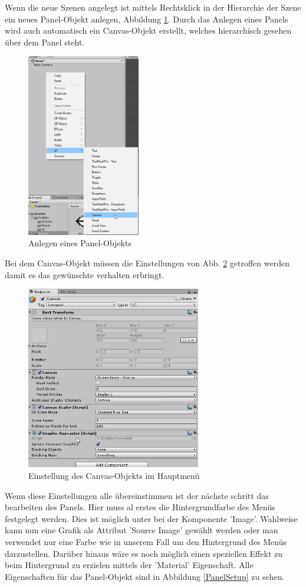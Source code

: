 Wenn die neue Szenen angelegt ist mittels Rechtsklick in der Hierarchie der Szene ein neues Panel-Objekt anlegen, Abbildung \ref{PanelAnlegen}. Durch das Anlegen eines Panels wird auch automatisch ein Canvas-Objekt erstellt, welches hierarchisch gesehen über dem Panel steht.

\begin{figure}[H]

	\includegraphics[height=8cm]{images/PanelAnlegen.png}
	\caption{Anlegen eines Panel-Objekts}
	\label{PanelAnlegen}
\end{figure}
Bei dem Canvas-Objekt müssen die Einstellungen von Abb. \ref{CanvasSetup} getroffen werden damit es das gewünschte verhalten erbringt.
\begin{figure}[H]
	\centering
	\includegraphics[height=8cm]{images/CanvasSetup.png}
	\caption{Einstellung des Canvas-Objekts im Hauptmenü}
	\label{CanvasSetup}
\end{figure}
Wenn diese Einstellungen alle übereinstimmen ist der nächste schritt das bearbeiten des Panels. Hier muss al erstes die Hintergrundfarbe des Menüs festgelegt werden. Dies ist möglich unter bei der Komponente 'Image'. Wahlweise kann nun eine Grafik als Attribut 'Source Image' gewählt werden oder man verwendet nur eine Farbe wie in unserem Fall um den Hintergrund des Menüs darzustellen. Darüber hinaus wäre es noch möglich einen speziellen Effekt zu beim Hintergrund zu erzielen mittels der 'Material' Eigenschaft. Alle Eigenschaften für das Panel-Objekt sind in Abbildung \ref{PanelSetup} zu sehen.
